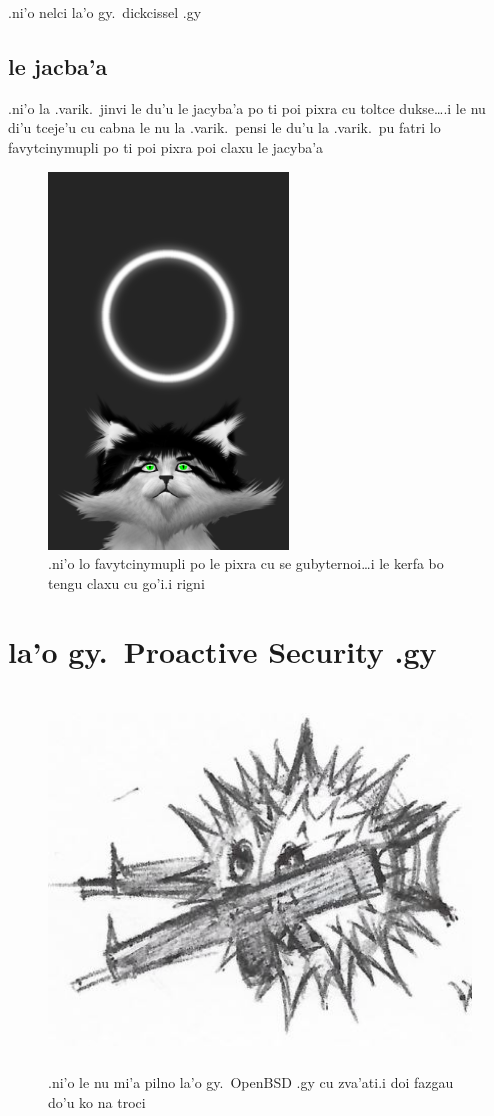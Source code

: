 \documentclass{report}
\begin{document}
.ni'o nelci la'o gy.\ dickcissel .gy

\section{le jacba'a}
.ni'o la .varik.\ jinvi le du'u le jacyba'a po ti poi pixra cu toltce dukse\ldots\@ .i le nu di'u tceje'u cu cabna le nu la .varik.\ pensi le du'u la .varik.\ pu fatri lo favytcinymupli po ti poi pixra poi claxu le jacyba'a

\begin{figure}[ht]
	\centering
	\includegraphics[height=10cm]{20200414042645-03/20200414042645-03-uw.png}
	\caption[center]{.ni'o lo favytcinymupli po le pixra cu se gubyternoi\ldots i le kerfa bo tengu claxu cu go'i\@  .i rigni}
\end{figure}
\chapter{la'o gy.\ Proactive Security .gy}
\begin{figure}[ht]
	\centering
	\includegraphics[height=10cm]{proactivesecurity/proactivesecurity.png}
	\caption[center]{.ni'o le nu mi'a pilno la'o gy.\ OpenBSD .gy cu zva'ati\@  .i doi fazgau do'u ko na troci}
\end{figure}
\end{document}
